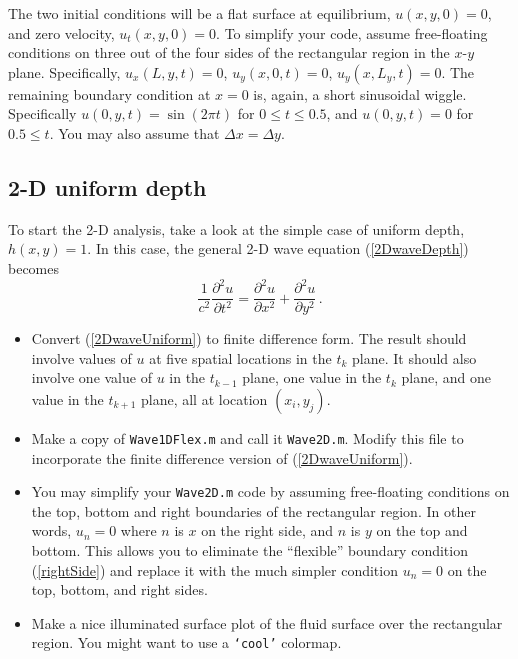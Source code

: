 \documentclass[11pt]{article}
\newcommand{\ds}{\displaystyle}
\begin{document}
The two initial conditions will be a flat surface at equilibrium,
$\ds u(x,y,0) = 0$, and zero velocity, $u_t(x,y,0) = 0$.
To simplify your code, assume free-floating
conditions on three out of the
four sides of the rectangular region in the $x$-$y$ plane. Specifically,
$u_x(L,y,t) = 0$, $u_y(x,0,t) = 0$, $u_y(x,L_y,t) = 0$. The remaining
boundary condition at $x=0$ is, again, a short sinusoidal wiggle.
Specifically $u(0,y,t) = \sin(2\pi t)$ for
$0 \le t \le 0.5$, and $u(0,y,t) = 0$ for $0.5 \le t$.
You may also assume that $\Delta x = \Delta y$.

\subsection{2-D uniform depth}
To start the 2-D analysis, take a look at the simple case of
uniform depth, $h(x,y) = 1$.
In this case, the general 2-D wave equation (\ref{2DwaveDepth}) becomes
\begin{equation}
\frac{1}{c^2}\frac{\partial^2 u}{\partial t^2}
                    = \frac{\partial^2 u}{\partial x^2}
                    + \frac{\partial^2 u}{\partial y^2}
                                                  \,.    \label{2DwaveUniform}
\end{equation}

\begin{itemize}

\item  Convert (\ref{2DwaveUniform}) to finite difference form.
The result should involve values of $u$ at five spatial locations
in the $t_k$ plane. It should
also involve one value of $u$ in the $t_{k-1}$ plane,
one value in the $t_{k}$ plane,
and one value in the $t_{k+1}$ plane, all at location $(x_i, y_j)$.

\item Make a copy of {\tt Wave1DFlex.m} and call it {\tt  Wave2D.m}.
Modify this file to incorporate the finite difference version of
(\ref{2DwaveUniform}).

\item You may simplify your {\tt  Wave2D.m} code by assuming
free-floating conditions on the top, bottom and right boundaries
of the rectangular region. In other words, $u_n = 0$ where $n$
is $x$ on the right side, and $n$ is $y$ on the top and bottom.
This allows you to eliminate the ``flexible'' boundary condition
(\ref{rightSide}) and replace it with the much simpler condition
$u_n = 0$ on the top, bottom, and right sides.

\item Make a nice illuminated surface plot of the
fluid surface over the rectangular region.
You might want to use a {\tt `cool'} colormap.

\end{itemize}
\end{document}
